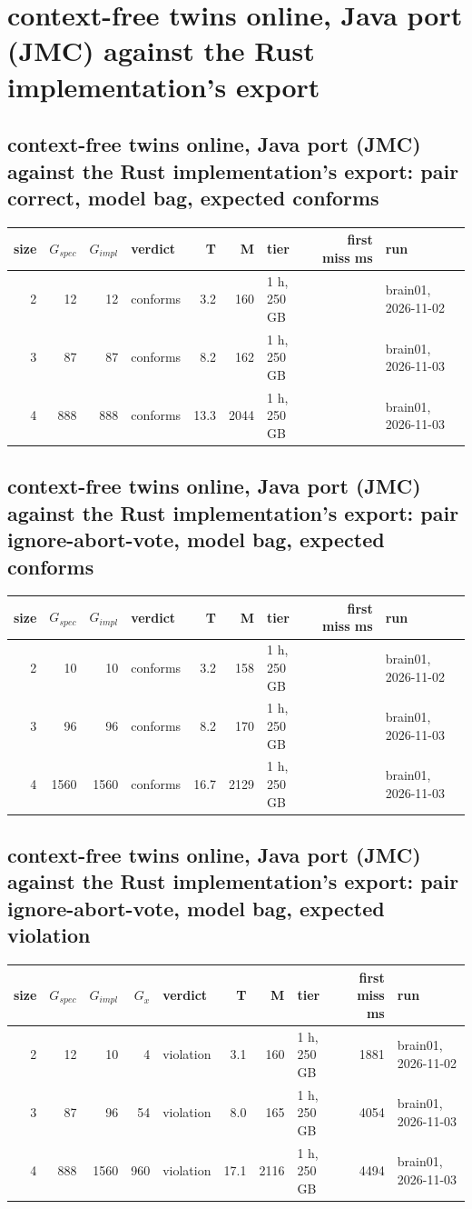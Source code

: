 \documentclass[10pt]{article}
\begin{document}
\section*{context-free twins online, Java port (JMC) against the Rust implementation's export}
\subsection*{context-free twins online, Java port (JMC) against the Rust implementation's export: pair \textsf{correct}, model bag, expected conforms}
\begin{longtable}{@{}rrrlrrlrl@{}}
\toprule
size & $G_{\mathit{spec}}$ & $G_{\mathit{impl}}$ & verdict & T & M & tier & first miss ms & run \\
\midrule
\endhead
\color{red} 2 & 12 & 12 & conforms & 3.2 & 160 & 1 h, 250 GB &  & brain01, 2026-11-02 \\
\color{blue} 3 & 87 & 87 & conforms & 8.2 & 162 & 1 h, 250 GB &  & brain01, 2026-11-03 \\
\color{blue} 4 & 888 & 888 & conforms & 13.3 & 2044 & 1 h, 250 GB &  & brain01, 2026-11-03 \\
\bottomrule
\end{longtable}
\subsection*{context-free twins online, Java port (JMC) against the Rust implementation's export: pair \textsf{ignore-abort-vote}, model bag, expected conforms}
\begin{longtable}{@{}rrrlrrlrl@{}}
\toprule
size & $G_{\mathit{spec}}$ & $G_{\mathit{impl}}$ & verdict & T & M & tier & first miss ms & run \\
\midrule
\endhead
\color{red} 2 & 10 & 10 & conforms & 3.2 & 158 & 1 h, 250 GB &  & brain01, 2026-11-02 \\
\color{blue} 3 & 96 & 96 & conforms & 8.2 & 170 & 1 h, 250 GB &  & brain01, 2026-11-03 \\
\color{blue} 4 & 1560 & 1560 & conforms & 16.7 & 2129 & 1 h, 250 GB &  & brain01, 2026-11-03 \\
\bottomrule
\end{longtable}
\subsection*{context-free twins online, Java port (JMC) against the Rust implementation's export: pair \textsf{ignore-abort-vote}, model bag, expected violation}
\begin{longtable}{@{}rrrrlrrlrl@{}}
\toprule
size & $G_{\mathit{spec}}$ & $G_{\mathit{impl}}$ & $G_x$ & verdict & T & M & tier & first miss ms & run \\
\midrule
\endhead
\color{red} 2 & 12 & 10 & 4 & violation & 3.1 & 160 & 1 h, 250 GB & 1881 & brain01, 2026-11-02 \\
\color{blue} 3 & 87 & 96 & 54 & violation & 8.0 & 165 & 1 h, 250 GB & 4054 & brain01, 2026-11-03 \\
\color{blue} 4 & 888 & 1560 & 960 & violation & 17.1 & 2116 & 1 h, 250 GB & 4494 & brain01, 2026-11-03 \\
\bottomrule
\end{longtable}
\end{document}

